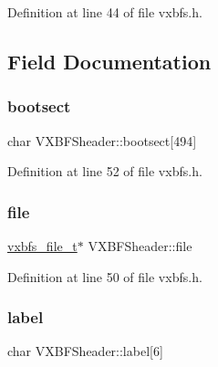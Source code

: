Definition at line 44 of file vxbfs.\+h.



\subsection{Field Documentation}
\mbox{\label{a00336_ac10458b5241cce411ef4dd4fff029d0e_ac10458b5241cce411ef4dd4fff029d0e}} 
\subsubsection{\texorpdfstring{bootsect}{bootsect}}
{\footnotesize\ttfamily char V\+X\+B\+F\+Sheader\+::bootsect\mbox{[}494\mbox{]}}



Definition at line 52 of file vxbfs.\+h.

\mbox{\label{a00336_a3b903de5c5034494530cdc0c2d4ff9b1_a3b903de5c5034494530cdc0c2d4ff9b1}} 
\subsubsection{\texorpdfstring{file}{file}}
{\footnotesize\ttfamily \hyperlink{a00206_abb93e2407af0d8fe0f5629ce6456c6f9_abb93e2407af0d8fe0f5629ce6456c6f9}{vxbfs\+\_\+file\+\_\+t}$\ast$ V\+X\+B\+F\+Sheader\+::file}



Definition at line 50 of file vxbfs.\+h.

\mbox{\label{a00336_af3cd6b4358b6ba93a7bd541c09c959c8_af3cd6b4358b6ba93a7bd541c09c959c8}} 
\subsubsection{\texorpdfstring{label}{label}}
{\footnotesize\ttfamily char V\+X\+B\+F\+Sheader\+::label\mbox{[}6\mbox{]}}



